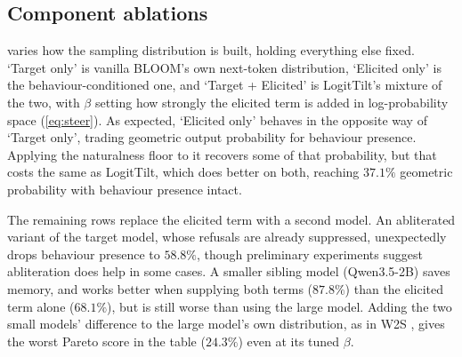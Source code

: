 \documentclass{article}
\theoremstyle{plain}
\theoremstyle{definition}
\theoremstyle{remark}
\begin{document}
\begin{table}[t]
  \centering
  \small
  \setlength{\tabcolsep}{5pt}
  \caption{\textbf{LogitTilt's elicitation is stable across which model generates BLOOM's inputs and which scores the transcripts.} The auditor is split into a generator (produces scenarios and inputs) and a judge (scores presence), each set to Gemma-4-26B-A4B or Claude-Sonnet-4.6. Row 1 corresponds to the default setup used throughout the paper. Other method results shown in \cref{app:methods-judge}.}
  \label{tab:auditor}
\end{table}





\subsection{Component ablations}

 varies how the sampling distribution is built, holding everything else fixed. `Target only' is vanilla BLOOM's own next-token distribution, `Elicited only' is the behaviour-conditioned one, and `Target + Elicited' is LogitTilt's mixture of the two, with $\beta$ setting how strongly the elicited term is added in log-probability space (\cref{eq:steer}). As expected, `Elicited only' behaves in the opposite way of `Target only', trading geometric output probability for behaviour presence. Applying the naturalness floor to it recovers some of that probability, but that costs the same as LogitTilt, which does better on both, reaching $37.1\%$ geometric probability with behaviour presence intact.

The remaining rows replace the elicited term with a second model. An abliterated variant of the target model, whose refusals are already suppressed, unexpectedly drops behaviour presence to $58.8\%$, though preliminary experiments suggest abliteration does help in some cases. A smaller sibling model (Qwen3.5-2B) saves memory, and works better when supplying both terms ($87.8\%$) than the elicited term alone ($68.1\%$), but is still worse than using the large model. Adding the two small models' difference to the large model's own distribution, as in W2S \citep{zhao2024weak}, gives the worst Pareto score in the table ($24.3\%$) even at its tuned $\beta$.
\end{document}
